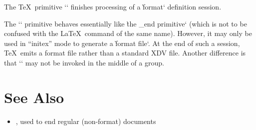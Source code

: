 
The \TeX\ primitive \tex`\dump` finishes processing of a \`format` definition
session.

The \tex`\dump` primitive behaves essentially like \`the _end primitive` (which is not to be
confused with the \LaTeX\ command of the same name). However, it may only be
used in “initex” mode to generate a \`format file`. At the end of such a session,
\TeX\ emits a format file rather than a standard XDV file. Another difference is
that \tex`\dump` may not be invoked in the middle of a group.

\section*{See Also}

\begin{itemize}
\item {}, used to end regular (non-format) documents
\end{itemize}
